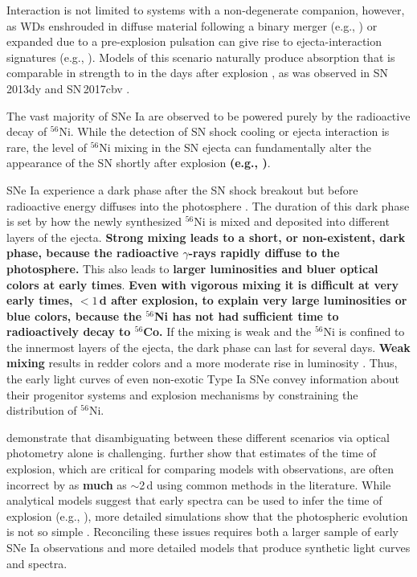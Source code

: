 \documentclass[twocolumn]{aastex61}
\begin{document}
Interaction is not limited to systems with a non-degenerate companion,
however, as WDs enshrouded in diffuse material following a binary merger
(e.g., \citealt{2015MNRAS.447.2803L}) or expanded due to a pre-explosion
pulsation can give rise to ejecta-interaction signatures (e.g.,
\citealt{2014MNRAS.441..532D}). Models of this scenario naturally produce
 absorption that is comparable in strength to  in the
days after explosion \citep{2014MNRAS.441..532D}, as was observed in
SN\,2013dy \citep{2013ApJ...778L..15Z} and SN\,2017cbv
\citep{2017ApJ...845L..11H}.

The vast majority of SNe Ia are observed to be powered purely by the
radioactive decay of $^{56}$Ni. While the detection of SN shock cooling or
ejecta interaction is rare, the level of $^{56}$Ni mixing in the SN ejecta can
fundamentally alter the appearance of the SN shortly after explosion
\textbf{(e.g.,
\citealt{2014MNRAS.441..532D,2016ApJ...826...96P,2017MNRAS.472.2787N})}. 

SNe Ia experience a dark phase after the SN shock breakout but before
radioactive energy diffuses into the photosphere \citep{2014ApJ...784...85P}.
The duration of this dark phase is set by how the newly synthesized $^{56}$Ni
is mixed and deposited into different layers of the ejecta. \textbf{Strong
mixing leads to a short, or non-existent, dark phase, because the radioactive
$\gamma$-rays rapidly diffuse to the photosphere.} This also leads to
\textbf{larger luminosities and bluer optical colors at early times}.
\textbf{Even with vigorous mixing it is difficult at very early times, $<
1$\,d after explosion, to explain very large luminosities or blue colors,
because the $^{56}$Ni has not had sufficient time to radioactively decay to
$^{56}$Co.} If the mixing is weak and the $^{56}$Ni is confined to the
innermost layers of the ejecta, the dark phase can last for several days.
\textbf{Weak mixing} results in redder colors and a more moderate rise in
luminosity \citep{2014MNRAS.441..532D,2016ApJ...826...96P}. Thus, the early
light curves of even non-exotic Type Ia SNe convey information about their
progenitor systems and explosion mechanisms by constraining the distribution
of $^{56}$Ni.

\citet{2017MNRAS.472.2787N} demonstrate that disambiguating between these
different scenarios via optical photometry alone is challenging.
\citeauthor{2017MNRAS.472.2787N} further show that estimates of the time of
explosion, which are critical for comparing models with observations, are
often incorrect by as \textbf{much} as $\sim$2\,d using common methods in the
literature. While analytical models suggest that early spectra can be used to
infer the time of explosion (e.g., \citealt{2014ApJ...784...85P}), more
detailed simulations show that the photospheric evolution is not so simple
\citep{2016ApJ...826...96P}. Reconciling these issues requires both a larger
sample of early SNe Ia observations and more detailed models that produce
synthetic light curves and spectra.
\end{document}
